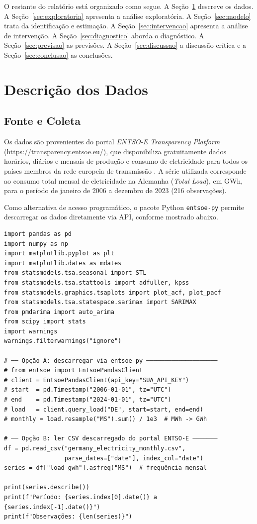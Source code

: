 \documentclass[12pt, a4paper]{article}
\begin{document}
O restante do relatório está organizado como segue. A Seção~\ref{sec:dados} descreve
os dados. A Seção~\ref{sec:exploratoria} apresenta a análise exploratória. A
Seção~\ref{sec:modelo} trata da identificação e estimação. A
Seção~\ref{sec:intervencao} apresenta a análise de intervenção. A
Seção~\ref{sec:diagnostico} aborda o diagnóstico. A Seção~\ref{sec:previsao} as
previsões. A Seção~\ref{sec:discussao} a discussão crítica e a
Seção~\ref{sec:conclusao} as conclusões.

\section{Descrição dos Dados}
\label{sec:dados}

\subsection{Fonte e Coleta}

Os dados são provenientes do portal \textit{ENTSO-E Transparency Platform}
(\url{https://transparency.entsoe.eu/}), que disponibiliza gratuitamente dados
horários, diários e mensais de produção e consumo de eletricidade para todos os países
membros da rede europeia de transmissão \cite{EntsoData}. A série utilizada corresponde
ao consumo total mensal de eletricidade na Alemanha (\textit{Total Load}), em GWh,
para o período de janeiro de 2006 a dezembro de 2023 (216 observações).

Como alternativa de acesso programático, o pacote Python \texttt{entsoe-py} permite
descarregar os dados diretamente via API, conforme mostrado abaixo.

\begin{lstlisting}[caption={Importação e preparação dos dados via \texttt{entsoe-py} e ficheiro CSV.},
                   label={lst:dados}]
import pandas as pd
import numpy as np
import matplotlib.pyplot as plt
import matplotlib.dates as mdates
from statsmodels.tsa.seasonal import STL
from statsmodels.tsa.stattools import adfuller, kpss
from statsmodels.graphics.tsaplots import plot_acf, plot_pacf
from statsmodels.tsa.statespace.sarimax import SARIMAX
from pmdarima import auto_arima
from scipy import stats
import warnings
warnings.filterwarnings("ignore")

# ── Opção A: descarregar via entsoe-py ────────────────────
# from entsoe import EntsoePandasClient
# client = EntsoePandasClient(api_key="SUA_API_KEY")
# start  = pd.Timestamp("2006-01-01", tz="UTC")
# end    = pd.Timestamp("2024-01-01", tz="UTC")
# load   = client.query_load("DE", start=start, end=end)
# monthly = load.resample("MS").sum() / 1e3  # MWh -> GWh

# ── Opção B: ler CSV descarregado do portal ENTSO-E ───────
df = pd.read_csv("germany_electricity_monthly.csv",
                 parse_dates=["date"], index_col="date")
series = df["load_gwh"].asfreq("MS")  # frequência mensal

print(series.describe())
print(f"Período: {series.index[0].date()} a {series.index[-1].date()}")
print(f"Observações: {len(series)}")
\end{lstlisting}
\end{document}
